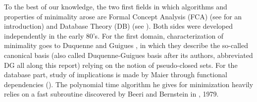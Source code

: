 \documentclass[a4paper, 10pt]{article}
\begin{document}
To the best of our knowledge, the two first fields in which algorithms and 
properties of minimality arose are Formal Concept Analysis (FCA) (see 
\cite{ganter_formal_1999, 
	ganter_two_2010} for an introduction) and Database Theory (DB) (see 
\cite{maier_theory_1983}). Both sides were developed independently in the early 
80's. For the first domain, characterization of minimality goes to Duquenne and 
Guigues \cite{guigues_familles_1986}, in which they describe the so-called 
canonical basis (also called Duquenne-Guigues basis after its 
authors, abbreviated DG all along this report) relying on the notion of pseudo-closed sets. For the database part, study of implications is made by Maier through functional dependencies (\cite{maier_theory_1983, maier_minimum_1980}). The polynomial time algorithm he gives for minimization heavily relies on a fast subroutine discovered by Beeri and Bernstein in \cite{beeri_computational_1979}, 1979.
\end{document}
